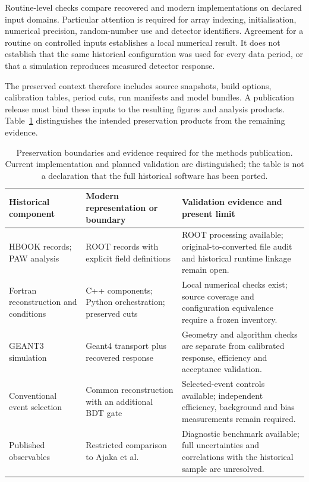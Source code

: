 \documentclass[10pt,aps,prd,amsmath,amssymb,superscriptaddress,twocolumn,nofootinbib,showpacs,showkeys,preprintnumbers,amsfonts,notitlepage,floatfix]{revtex4-2}
\begin{document}
Routine-level checks compare recovered and modern implementations on declared input domains. Particular attention is required for array indexing, initialisation, numerical precision, random-number use and detector identifiers. Agreement for a routine on controlled inputs establishes a local numerical result. It does not establish that the same historical configuration was used for every data period, or that a simulation reproduces measured detector response.

The preserved context therefore includes source snapshots, build options, calibration tables, period cuts, run manifests and model bundles. A publication release must bind these inputs to the resulting figures and analysis products. Table~\ref{tab:preservation} distinguishes the intended preservation products from the remaining evidence.

\begin{table}[t]
\caption{Preservation boundaries and evidence required for the methods publication. Current implementation and planned validation are distinguished; the table is not a declaration that the full historical software has been ported.}
\label{tab:preservation}
\begin{ruledtabular}
\begin{tabular}{p{}p{}p{}}
Historical component & Modern representation or boundary & Validation evidence and present limit \\
\hline
HBOOK records; PAW analysis & ROOT records with explicit field definitions & ROOT processing available; original-to-converted file audit and historical runtime linkage remain open. \\
Fortran reconstruction and conditions & C++ components; Python orchestration; preserved cuts & Local numerical checks exist; source coverage and configuration equivalence require a frozen inventory. \\
GEANT3 simulation & Geant4 transport plus recovered response & Geometry and algorithm checks are separate from calibrated response, efficiency and acceptance validation. \\
Conventional event selection & Common reconstruction with an additional BDT gate & Selected-event controls available; independent efficiency, background and bias measurements remain required. \\
Published observables & Restricted comparison to Ajaka et al. & Diagnostic benchmark available; full uncertainties and correlations with the historical sample are unresolved. \\
\end{tabular}
\end{ruledtabular}
\end{table}
\end{document}
